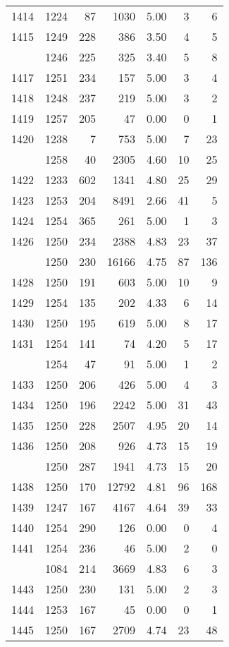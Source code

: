 \documentclass[
]{article}
\begin{document}
\begin{table}
\begin{tabular}[t]{lrrrrrr}
1414 & 1224 & 87 & 1030 & 5.00 & 3 & 6\\
1415 & 1249 & 228 & 386 & 3.50 & 4 & 5\\
\addlinespace
1416 & 1246 & 225 & 325 & 3.40 & 5 & 8\\
1417 & 1251 & 234 & 157 & 5.00 & 3 & 4\\
1418 & 1248 & 237 & 219 & 5.00 & 3 & 2\\
1419 & 1257 & 205 & 47 & 0.00 & 0 & 1\\
1420 & 1238 & 7 & 753 & 5.00 & 7 & 23\\
\addlinespace
1421 & 1258 & 40 & 2305 & 4.60 & 10 & 25\\
1422 & 1233 & 602 & 1341 & 4.80 & 25 & 29\\
1423 & 1253 & 204 & 8491 & 2.66 & 41 & 5\\
1424 & 1254 & 365 & 261 & 5.00 & 1 & 3\\
1426 & 1250 & 234 & 2388 & 4.83 & 23 & 37\\
\addlinespace
1427 & 1250 & 230 & 16166 & 4.75 & 87 & 136\\
1428 & 1250 & 191 & 603 & 5.00 & 10 & 9\\
1429 & 1254 & 135 & 202 & 4.33 & 6 & 14\\
1430 & 1250 & 195 & 619 & 5.00 & 8 & 17\\
1431 & 1254 & 141 & 74 & 4.20 & 5 & 17\\
\addlinespace
1432 & 1254 & 47 & 91 & 5.00 & 1 & 2\\
1433 & 1250 & 206 & 426 & 5.00 & 4 & 3\\
1434 & 1250 & 196 & 2242 & 5.00 & 31 & 43\\
1435 & 1250 & 228 & 2507 & 4.95 & 20 & 14\\
1436 & 1250 & 208 & 926 & 4.73 & 15 & 19\\
\addlinespace
1437 & 1250 & 287 & 1941 & 4.73 & 15 & 20\\
1438 & 1250 & 170 & 12792 & 4.81 & 96 & 168\\
1439 & 1247 & 167 & 4167 & 4.64 & 39 & 33\\
1440 & 1254 & 290 & 126 & 0.00 & 0 & 4\\
1441 & 1254 & 236 & 46 & 5.00 & 2 & 0\\
\addlinespace
1442 & 1084 & 214 & 3669 & 4.83 & 6 & 3\\
1443 & 1250 & 230 & 131 & 5.00 & 2 & 3\\
1444 & 1253 & 167 & 45 & 0.00 & 0 & 1\\
1445 & 1250 & 167 & 2709 & 4.74 & 23 & 48\\

\end{tabular}
\end{table}
\end{document}
